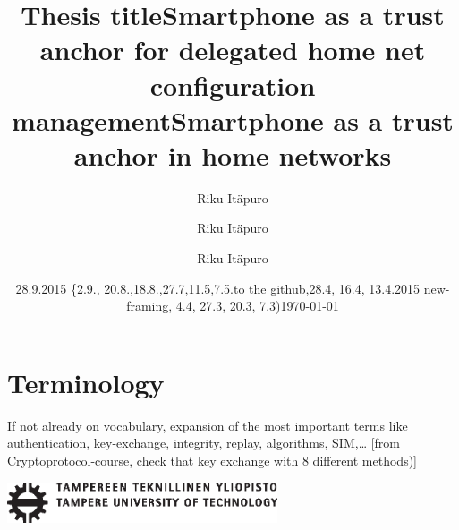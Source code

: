 \documentclass[12pt,a4paper,english]{tutthesis}
\author{Riku Itäpuro}
\title{Thesis title}      %
\author{Riku Itäpuro}
\title{Smartphone as a trust anchor for delegated home net configuration management}
\author{Riku Itäpuro}
\date{28.9.2015 \{2.9., 20.8.,18.8.,27.7,11.5,7.5.to the github,28.4, 16.4, 13.4.2015 new-framing, 4.4, 27.3,  20.3, 7.3)}
\title{Smartphone as a trust anchor in home networks}
\begin{document}
\maketitle



\chapter*{Terminology}
\markboth{}{}                                %

If not already on vocabulary, expansion of the most important terms like
authentication, key-exchange, integrity, replay, algorithms, SIM,\ldots{}
[from Cryptoprotocol-course, check that key exchange with 8 different methods)]

\newpage             %

 \pagestyle{headings}
 \thispagestyle{empty}
\date\today
 \vspace*{-.5cm}\noindent
 \includegraphics[width=8cm]{tty_tut_logo}   %

\vspace{6.8cm}
\maketitle
\vspace{6.7cm} %
\end{document}
